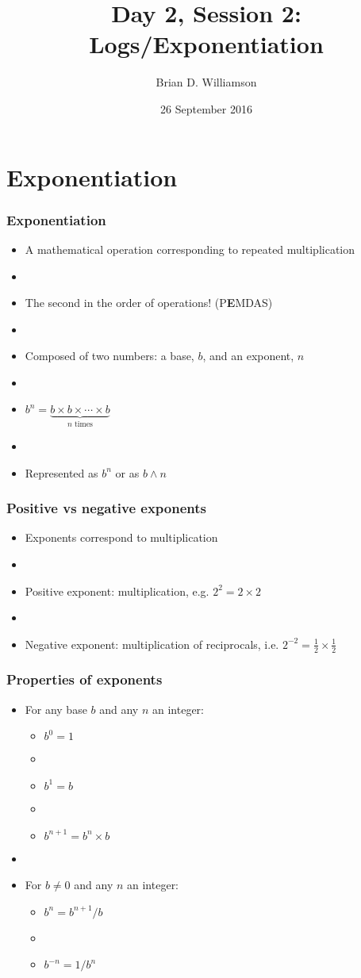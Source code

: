 \documentclass[12pt]{beamer}
\title{Day 2, Session 2: Logs/Exponentiation}
\author{Brian D. Williamson}
\institute{EPI/BIOST Bootcamp 2016}
\date{26 September 2016}
\newcommand{\myframe}[1]{\begin{frame} \frametitle{#1}}
\begin{document}
\begin{frame}
\titlepage
\end{frame}

\section{Exponentiation}
\myframe{Exponentiation}
\begin{itemize}
\item A mathematical operation corresponding to repeated multiplication
\item[]
\item The second in the order of operations! (P{\textbf E}MDAS)
\item[]
\item Composed of two numbers: a base, $b$, and an exponent, $n$
\item[]
\item $b^n = \underbrace{b\times b \times \cdots \times b}_\text{$n$ times}$
\item[]
\item Represented as $b^n$ or as $b \wedge n$
\end{itemize}
\end{frame}

\myframe{Positive vs negative exponents}
\begin{itemize}
\item Exponents correspond to multiplication
\item[]
\item Positive exponent: multiplication, e.g. $2^2 = 2\times 2$
\item[]
\item Negative exponent: multiplication of reciprocals, i.e. $2^{-2} = \frac{1}{2}\times \frac{1}{2}$
\end{itemize}
\end{frame}

\myframe{Properties of exponents}
\begin{itemize}
\item For any base $b$ and any $n$ an integer:
\begin{itemize}
\item $b^0 = 1$
\item[]
\item $b^1 = b$
\item[]
\item $b^{n+1} = b^n \times b$
\end{itemize}
\item[]
\item For $b \neq 0$ and any $n$ an integer:
\begin{itemize}
\item $b^n = b^{n+1}/b$
\item[]
\item $b^{-n} = 1/b^n$
\end{itemize}
\end{itemize}
\end{frame}
\end{document}
